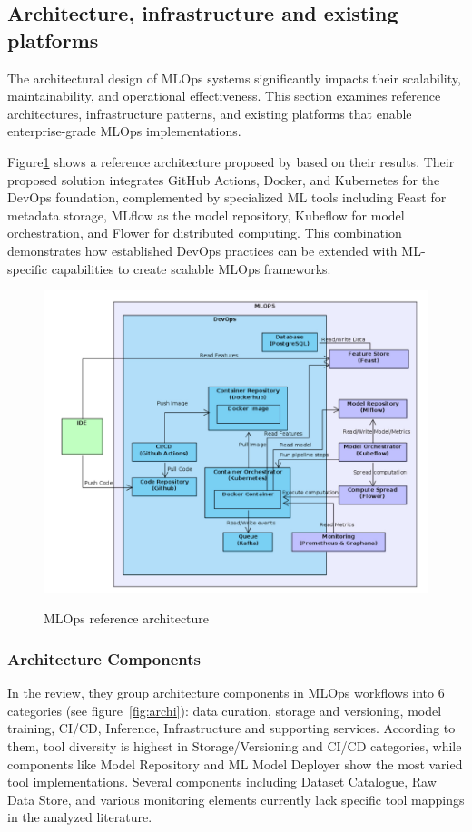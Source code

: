 \subsection{Architecture, infrastructure and existing platforms}\label{subsec:architecture-infrastructure-and-existing-platforms}
The architectural design of MLOps systems significantly impacts their scalability, maintainability, and operational effectiveness.
This section examines reference architectures, infrastructure patterns, and existing platforms that enable enterprise-grade MLOps implementations.

Figure\ref{fig:infra} shows a reference architecture proposed by\cite{10855428} based on their results.
Their proposed solution integrates GitHub Actions, Docker, and Kubernetes for the DevOps foundation,
complemented by specialized ML tools including Feast for metadata storage, MLflow as the model repository, Kubeflow for model orchestration,
and Flower for distributed computing.
This combination demonstrates how established DevOps practices can be extended with ML-specific capabilities to create scalable MLOps frameworks.

\begin{figure}[!htbp]
    \caption{MLOps reference architecture\cite{10855428}}
    \centering
    \includegraphics[scale=0.35]{images/infrastructure}
    \label{fig:infra}
\end{figure}

\subsubsection{Architecture Components}
In the review\cite{Amou_Najafabadi_2024}, they group architecture components in MLOps workflows into 6 categories (see figure~\ref{fig:archi}):
data curation, storage and versioning, model training, CI/CD, Inference, Infrastructure and supporting services.
According to them\cite{Amou_Najafabadi_2024}, tool diversity is highest in Storage/Versioning and CI/CD categories, while components like Model Repository and ML Model Deployer show the most varied tool implementations.
Several components including Dataset Catalogue, Raw Data Store, and various monitoring elements currently lack specific tool mappings in the analyzed literature.

